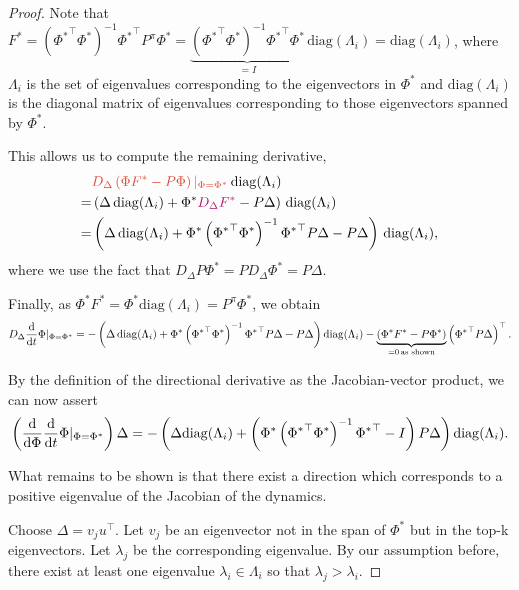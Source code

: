 \begin{proof}
Note that $F^* = \left({\Phi^*}^\top{\Phi^*}\right)^{-1} {\Phi^*}^\top P^\pi {\Phi^*} = \underbrace{\left({\Phi^*}^\top{\Phi^*}\right)^{-1} {\Phi^*}^\top {\Phi^*}}_{=I}\, \mathrm{diag}(\Lambda_i) = \mathrm{diag}(\Lambda_i)$, where $\Lambda_i$ is the set of eigenvalues corresponding to the eigenvectors in $\Phi^*$ and $\mathrm{diag}(\Lambda_i)$ is the diagonal matrix of eigenvalues corresponding to those eigenvectors spanned by $\Phi^*$.

This allows us to compute the remaining derivative,
\begin{align*}
    &{\color{uoftred}D_\Delta \left(\Phi F^* - P \Phi\right)|_{\Phi=\Phi^*}}\, \mathrm{diag}(\Lambda_i)\\
    = & \left(\Delta\, \mathrm{diag}(\Lambda_i) + \Phi^*{\color{uoftmagenta} D_\Delta F^*}  - P\Delta \right)\,\mathrm{diag}(\Lambda_i)\\
    = & \left(\Delta\, \mathrm{diag}(\Lambda_i) + \Phi^*\left({\Phi^*}^\top {\Phi^*}\right)^{-1}{\Phi^*}^\top P \Delta  - P\Delta \right)\,\mathrm{diag}(\Lambda_i),
\end{align*}
where we use the fact that $D_\Delta P\Phi^* = P D_\Delta \Phi^* = P \Delta$.

Finally, as $\Phi^*F^* = \Phi^* \mathrm{diag}(\Lambda_i) = P^\pi \Phi^*$, we obtain
\begin{align*}
 D_\Delta \frac{\mathrm{d}}{\mathrm{d} t} \Phi |_{\Phi=\Phi^*} =   -\left(\Delta\, \mathrm{diag}(\Lambda_i) + {\Phi^*}\left({\Phi^*}^\top \Phi^*\right)^{-1}{\Phi^*}^\top P \Delta  - P\Delta \right)\mathrm{diag}(\Lambda_i) - \underbrace{\left(\Phi^* F^* - P \Phi^*\right)}_{=0\,\text{as shown}}\left({\Phi^*}^\top P \Delta\right)^\top.
\end{align*}


By the definition of the directional derivative as the Jacobian-vector product, we can now assert
\begin{align*}
    \left(\frac{\mathrm{d}}{\mathrm{d} \Phi} \frac{\mathrm{d}}{\mathrm{d} t}\Phi |_{\Phi=\Phi^*}\right) \Delta = - \left(\Delta \mathrm{diag}(\Lambda_i) + \left(\Phi^*\left({\Phi^*}^\top {\Phi^*}\right)^{-1}{\Phi^*}^\top - I\right) P \Delta\right)\mathrm{diag}(\Lambda_i).
\end{align*}

What remains to be shown is that there exist a direction which corresponds to a positive eigenvalue of the Jacobian of the dynamics.

Choose $\Delta = v_j u^\top$. Let $v_j$ be an eigenvector not in the span of $\Phi^*$ but in the top-k eigenvectors. Let  $\lambda_j$ be the corresponding eigenvalue. By our assumption before, there exist at least one eigenvalue $\lambda_i \in \Lambda_i$ so that $\lambda_j > \lambda_i$.


\end{proof}
